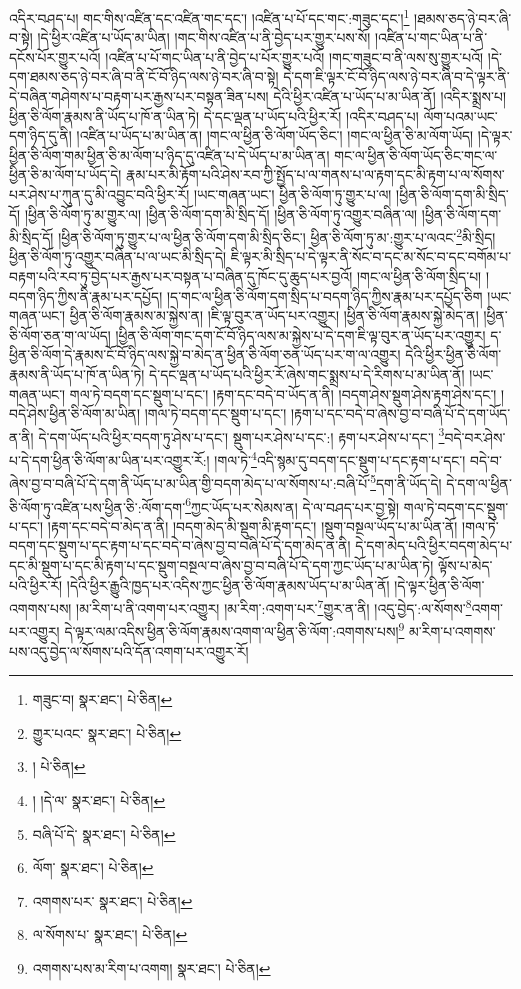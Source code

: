 འདིར་བཤད་པ། གང་གིས་འཛིན་དང་འཛིན་གང་དང་། །འཛིན་པ་པོ་དང་གང་:གཟུང་དང་།\footnote{གཟུང་བ།  སྣར་ཐང་།  པེ་ཅིན། } །ཐམས་ཅད་ཉེ་བར་ཞི་བ་སྟེ། །དེ་ཕྱིར་འཛིན་པ་ཡོད་མ་ཡིན། །གང་གིས་འཛིན་པ་ནི་བྱེད་པར་གྱུར་པས་སོ། །འཛིན་པ་གང་ཡིན་པ་ནི་དངོས་པོར་གྱུར་པའོ། །འཛིན་པ་པོ་གང་ཡིན་པ་ནི་བྱེད་པ་པོར་གྱུར་པའོ། །གང་གཟུང་བ་ནི་ལས་སུ་གྱུར་པའོ། །དེ་དག་ཐམས་ཅད་ཉེ་བར་ཞི་བ་ནི་ངོ་བོ་ཉིད་ལས་ཉེ་བར་ཞི་བ་སྟེ། དེ་དག་ཇི་ལྟར་ངོ་བོ་ཉིད་ལས་ཉེ་བར་ཞི་བ་དེ་ལྟར་ནི་དེ་བཞིན་གཤེགས་པ་བརྟག་པར་རྒྱས་པར་བསྟན་ཟིན་པས། དེའི་ཕྱིར་འཛིན་པ་ཡོད་པ་མ་ཡིན་ནོ། །འདིར་སྨྲས་པ། ཕྱིན་ཅི་ལོག་རྣམས་ནི་ཡོད་པ་ཁོ་ན་ཡིན་ཏེ། དེ་དང་ལྡན་པ་ཡོད་པའི་ཕྱིར་རོ། །འདིར་བཤད་པ། ལོག་པའམ་ཡང་དག་ཉིད་དུ་ནི། །འཛིན་པ་ཡོད་པ་མ་ཡིན་ན། །གང་ལ་ཕྱིན་ཅི་ལོག་ཡོད་ཅིང་། །གང་ལ་ཕྱིན་ཅི་མ་ལོག་ཡོད། །དེ་ལྟར་ཕྱིན་ཅི་ལོག་གམ་ཕྱིན་ཅི་མ་ལོག་པ་ཉིད་དུ་འཛིན་པ་དེ་ཡོད་པ་མ་ཡིན་ན། གང་ལ་ཕྱིན་ཅི་ལོག་ཡོད་ཅིང་གང་ལ་ཕྱིན་ཅི་མ་ལོག་པ་ཡོད་དེ། རྣམ་པར་མི་རྟོག་པའི་ཤེས་རབ་ཀྱི་སྤྱོད་པ་ལ་གནས་པ་ལ་རྟག་དང་མི་རྟག་པ་ལ་སོགས་པར་ཤེས་པ་ཀུན་དུ་མི་འབྱུང་བའི་ཕྱིར་རོ། །ཡང་གཞན་ཡང་། ཕྱིན་ཅི་ལོག་ཏུ་གྱུར་པ་ལ། །ཕྱིན་ཅི་ལོག་དག་མི་སྲིད་དོ། །ཕྱིན་ཅི་ལོག་ཏུ་མ་གྱུར་ལ། །ཕྱིན་ཅི་ལོག་དག་མི་སྲིད་དོ། །ཕྱིན་ཅི་ལོག་ཏུ་འགྱུར་བཞིན་ལ། །ཕྱིན་ཅི་ལོག་དག་མི་སྲིད་དོ། །ཕྱིན་ཅི་ལོག་ཏུ་གྱུར་པ་ལ་ཕྱིན་ཅི་ལོག་དག་མི་སྲིད་ཅིང་། ཕྱིན་ཅི་ལོག་ཏུ་མ་:གྱུར་པ་ལའང་\footnote{གྱུར་པའང་  སྣར་ཐང་།  པེ་ཅིན། }མི་སྲིད། ཕྱིན་ཅི་ལོག་ཏུ་འགྱུར་བཞིན་པ་ལ་ཡང་མི་སྲིད་དེ། ཇི་ལྟར་མི་སྲིད་པ་དེ་ལྟར་ནི་སོང་བ་དང་མ་སོང་བ་དང་བགོམ་པ་བརྟག་པའི་རབ་ཏུ་བྱེད་པར་རྒྱས་པར་བསྟན་པ་བཞིན་དུ་ཁོང་དུ་ཆུད་པར་བྱའོ། །གང་ལ་ཕྱིན་ཅི་ལོག་སྲིད་པ། །བདག་ཉིད་ཀྱིས་ནི་རྣམ་པར་དཔྱོད། །ད་གང་ལ་ཕྱིན་ཅི་ལོག་དག་སྲིད་པ་བདག་ཉིད་ཀྱིས་རྣམ་པར་དཔྱོད་ཅིག །ཡང་གཞན་ཡང་། ཕྱིན་ཅི་ལོག་རྣམས་མ་སྐྱེས་ན། །ཇི་ལྟ་བུར་ན་ཡོད་པར་འགྱུར། །ཕྱིན་ཅི་ལོག་རྣམས་སྐྱེ་མེད་ན། །ཕྱིན་ཅི་ལོག་ཅན་ག་ལ་ཡོད། །ཕྱིན་ཅི་ལོག་གང་དག་ངོ་བོ་ཉིད་ལས་མ་སྐྱེས་པ་དེ་དག་ཇི་ལྟ་བུར་ན་ཡོད་པར་འགྱུར། ད་ཕྱིན་ཅི་ལོག་དེ་རྣམས་ངོ་བོ་ཉིད་ལས་སྐྱེ་བ་མེད་ན་ཕྱིན་ཅི་ལོག་ཅན་ཡོད་པར་ག་ལ་འགྱུར། དེའི་ཕྱིར་ཕྱིན་ཅི་ལོག་རྣམས་ནི་ཡོད་པ་ཁོ་ན་ཡིན་ཏེ། དེ་དང་ལྡན་པ་ཡོད་པའི་ཕྱིར་རོ་ཞེས་གང་སྨྲས་པ་དེ་རིགས་པ་མ་ཡིན་ནོ། །ཡང་གཞན་ཡང་། གལ་ཏེ་བདག་དང་སྡུག་པ་དང་། །རྟག་དང་བདེ་བ་ཡོད་ན་ནི། །བདག་ཤེས་སྡུག་ཤེས་རྟག་ཤེས་དང་། །བདེ་ཤེས་ཕྱིན་ཅི་ལོག་མ་ཡིན། །གལ་ཏེ་བདག་དང་སྡུག་པ་དང་། །རྟག་པ་དང་བདེ་བ་ཞེས་བྱ་བ་བཞི་པོ་དེ་དག་ཡོད་ན་ནི། དེ་དག་ཡོད་པའི་ཕྱིར་བདག་ཏུ་ཤེས་པ་དང་། སྡུག་པར་ཤེས་པ་དང་:། རྟག་པར་ཤེས་པ་དང་། \footnote{།    པེ་ཅིན། }བདེ་བར་ཤེས་པ་དེ་དག་ཕྱིན་ཅི་ལོག་མ་ཡིན་པར་འགྱུར་རོ:། །གལ་ཏེ་\footnote{། །དེ་ལ་  སྣར་ཐང་།  པེ་ཅིན། }འདི་སྙམ་དུ་བདག་དང་སྡུག་པ་དང་རྟག་པ་དང་། བདེ་བ་ཞེས་བྱ་བ་བཞི་པོ་དེ་དག་ནི་ཡོད་པ་མ་ཡིན་གྱི་བདག་མེད་པ་ལ་སོགས་པ་:བཞི་པོ་\footnote{བཞི་པོ་དེ་  སྣར་ཐང་།  པེ་ཅིན། }དག་ནི་ཡོད་དེ། དེ་དག་ལ་ཕྱིན་ཅི་ལོག་ཏུ་འཛིན་པས་ཕྱིན་ཅི་:ལོག་དག་\footnote{ལོག་  སྣར་ཐང་།  པེ་ཅིན། }ཀྱང་ཡོད་པར་སེམས་ན། དེ་ལ་བཤད་པར་བྱ་སྟེ། གལ་ཏེ་བདག་དང་སྡུག་པ་དང་། །རྟག་དང་བདེ་བ་མེད་ན་ནི། །བདག་མེད་མི་སྡུག་མི་རྟག་དང་། །སྡུག་བསྔལ་ཡོད་པ་མ་ཡིན་ནོ། །གལ་ཏེ་བདག་དང་སྡུག་པ་དང་རྟག་པ་དང་བདེ་བ་ཞེས་བྱ་བ་བཞི་པོ་དེ་དག་མེད་ན་ནི། དེ་དག་མེད་པའི་ཕྱིར་བདག་མེད་པ་དང་མི་སྡུག་པ་དང་མི་རྟག་པ་དང་སྡུག་བསྔལ་བ་ཞེས་བྱ་བ་བཞི་པོ་དེ་དག་ཀྱང་ཡོད་པ་མ་ཡིན་ཏེ། ལྟོས་པ་མེད་པའི་ཕྱིར་རོ། །དེའི་ཕྱིར་རྒྱུའི་ཁྱད་པར་འདིས་ཀྱང་ཕྱིན་ཅི་ལོག་རྣམས་ཡོད་པ་མ་ཡིན་ནོ། །དེ་ལྟར་ཕྱིན་ཅི་ལོག་འགགས་པས། །མ་རིག་པ་ནི་འགག་པར་འགྱུར། །མ་རིག་:འགག་པར་\footnote{འགགས་པར་  སྣར་ཐང་།  པེ་ཅིན། }གྱུར་ན་ནི། །འདུ་བྱེད་:ལ་སོགས་\footnote{ལ་སོགས་པ་  སྣར་ཐང་།  པེ་ཅིན། }འགག་པར་འགྱུར། དེ་ལྟར་ལམ་འདིས་ཕྱིན་ཅི་ལོག་རྣམས་འགག་ལ་ཕྱིན་ཅི་ལོག་:འགགས་པས།\footnote{འགགས་པས་མ་རིག་པ་འགག།  སྣར་ཐང་།  པེ་ཅིན། } མ་རིག་པ་འགགས་པས་འདུ་བྱེད་ལ་སོགས་པའི་དོན་འགག་པར་འགྱུར་རོ། 